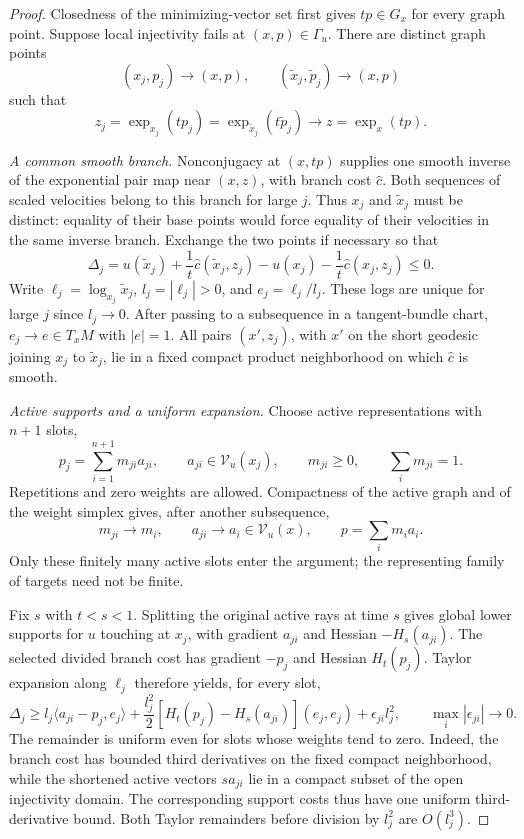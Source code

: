 \begin{proof}
Closedness of the minimizing-vector set first gives
$tp\in G_x$ for every graph point. Suppose local injectivity fails
at $(x,p)\in\Gamma_u$. There are distinct graph points
\[
 (x_j,p_j)\longrightarrow(x,p),\qquad
 (\widetilde x_j,\widetilde p_j)\longrightarrow(x,p)
\]
such that
\[
 z_j=\exp_{x_j}(tp_j)
     =\exp_{\widetilde x_j}(t\widetilde p_j)
 \longrightarrow z=\exp_x(tp).
\]

\smallskip\noindent
\emph{A common smooth branch.}
Nonconjugacy at $(x,tp)$ supplies one smooth inverse of the exponential
pair map near $(x,z)$, with branch cost $\hat c$. Both sequences of
scaled velocities belong to this branch for large $j$. Thus $x_j$
and $\widetilde x_j$ must be distinct: equality of their base points
would force equality of their velocities in the same inverse branch.
Exchange the two points if necessary so that
\[
 \Delta_j=u(\widetilde x_j)+\frac1t\hat c(\widetilde x_j,z_j)
          -u(x_j)-\frac1t\hat c(x_j,z_j)\leq0.
\]
Write $\ell_j=\log_{x_j}\widetilde x_j$, $l_j=|\ell_j|>0$,
and $e_j=\ell_j/l_j$. These logs are unique for large $j$ since
$l_j\to0$. After passing to a subsequence in a tangent-bundle chart,
$e_j\to e\in T_xM$ with $|e|=1$. All pairs $(x',z_j)$, with $x'$
on the short geodesic joining $x_j$ to $\widetilde x_j$, lie in a
fixed compact product neighborhood on which $\hat c$ is smooth.

\smallskip\noindent
\emph{Active supports and a uniform expansion.}
Choose active representations with $n+1$ slots,
\[
 p_j=\sum_{i=1}^{n+1}m_{ji}a_{ji},\qquad
 a_{ji}\in\mathcal V_u(x_j),\qquad
 m_{ji}\geq0,\qquad \sum_i m_{ji}=1.
\]
Repetitions and zero weights are allowed. Compactness of the active
graph and of the weight simplex gives, after another subsequence,
\[
 m_{ji}\to m_i,\qquad a_{ji}\to a_i\in\mathcal V_u(x),
 \qquad p=\sum_i m_i a_i.
\]
Only these finitely many active slots enter the argument; the
representing family of targets need not be finite.

Fix $s$ with $t<s<1$. Splitting the original active rays at time $s$
gives global lower supports for $u$ touching at $x_j$, with gradient
$a_{ji}$ and Hessian $-H_s(a_{ji})$. The selected divided branch cost
has gradient $-p_j$ and Hessian $H_t(p_j)$. Taylor expansion along
$\ell_j$ therefore yields, for every slot,
\begin{equation}
 \Delta_j\geq
 l_j\langle a_{ji}-p_j,e_j\rangle
 +\frac{l_j^2}{2}
   [H_t(p_j)-H_s(a_{ji})](e_j,e_j)
 +\epsilon_{ji}l_j^2,
 \qquad \max_i|\epsilon_{ji}|\longrightarrow0.
 \label{geo:collision-expansion}
\end{equation}
The remainder is uniform even for slots whose weights tend to zero.
Indeed, the branch cost has bounded third derivatives on the fixed
compact neighborhood, while the shortened active vectors $sa_{ji}$
lie in a compact subset of the open injectivity domain. The
corresponding support costs thus have one uniform third-derivative
bound. Both Taylor remainders before division by $l_j^2$ are
$O(l_j^3)$.


\end{proof}
